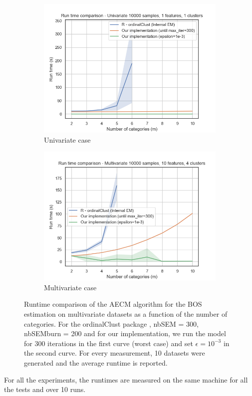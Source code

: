 \begin{figure}[H]
    \centering
    \begin{subfigure}[b]{0.49\textwidth}
    \includegraphics[width=1\textwidth]{python_figures/run_time_comparison_univariate_epsilon.png}
        \caption{Univariate case}
    \label{fig:runtime_univariate_epsilon}
    \end{subfigure}
    \hfill
    \begin{subfigure}[b]{0.49\textwidth}
    \includegraphics[width=1\textwidth]{python_figures/run_time_comparison_multivariate_epsilon.png}
        \caption{Multivariate case}
    \label{fig:runtime_multivariate_epsilon}
    \end{subfigure}
    \caption{Runtime comparison of the AECM algorithm for the BOS estimation on multivariate datasets as a function of the number of categories. For the ordinalClust package \cite{selosse2021ordinalclust}, nbSEM = 300, nbSEMburn = 200 and for our implementation, we run the model for $300$ iterations in the first curve (worst case) and set $\epsilon = 10^{-3}$ in the second curve. For every measurement, 10 datasets were generated and the average runtime is reported.}
    \label{fig:runtime_epsilon}
\end{figure}
For all the experiments, the runtimes are measured on the same machine for all the tests and over 10 runs.


